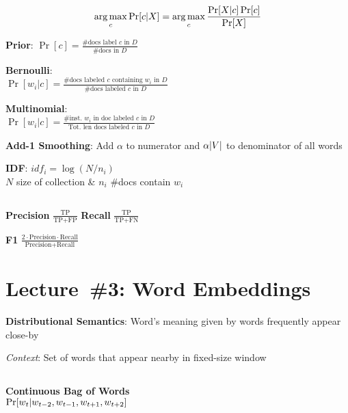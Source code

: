 \documentclass[9pt]{extarticle}
\renewcommand{\green}[1]{{\color{ForestGreen} #1}}
\begin{document}
\begin{multicols}{3}
  \begin{equation*}\label{eq:L02:NaiveBayes}
    \operatorname*{arg\,max}_c \Pr\lbrack c \vert X\rbrack = \operatorname*{arg\,max}_{c} \frac{\Pr[X \vert c] \Pr[c]}{\Pr[X]}
  \end{equation*}

  \green{\textbf{Prior}}: $\Pr[c] = \frac{\text{\#docs label } c \text{ in } D}{\text{\#docs in } D}$

  \green{\textbf{Bernoulli}}: \\ $\Pr[w_ i \vert c] = \frac{\text{\# docs labeled } c \text{ containing } w_i \text{ in } D}{\text{\#docs labeled } c \text{ in } D}$

  \green{\textbf{Multinomial}}: \\ $\Pr[w_i \vert c] = \frac{\text{\# inst.\ } w_i \text{ in doc labeled } c \text{ in } D}{\text{Tot.\ len docs labeled } c \text{ in } D}$

  \green{\textbf{Add-1 Smoothing}}: Add $\alpha$ to numerator and $\alpha\lvert V\rvert$ to denominator of all words

  \textbf{\green{IDF}}: $idf_i = \log \left(N/n_i\right)$ \\ $N$ size of collection \& $n_i$ \#docs contain $w_i$

  \subsection*{}

  \textbf{\green{Precision}} $\frac{\text{TP}}{\text{TP} + \text{FP}}$ \hspace{0.1cm} \textbf{\green{Recall}} $\frac{\text{TP}}{\text{TP} + \text{FN}}$

  \textbf{\green{F1}} $\frac{2 \cdot \text{Precision} \cdot \text{Recall}}{\text{Precision} + \text{Recall}}$

  \section*{Lecture~\#3: Word Embeddings}
  \textbf{\green{Distributional Semantics}}: Word's meaning given by words frequently appear close-by

  \textit{Context}: Set of words that appear nearby in fixed-size window

  \subsection*{}

  \textbf{\green{Continuous Bag of Words}} \\ ${\Pr\lbrack w_t \vert w_{t-2}, w_{t-1}, w_{t+1}, w_{t+2}\rbrack}$


\end{multicols}
\end{document}

